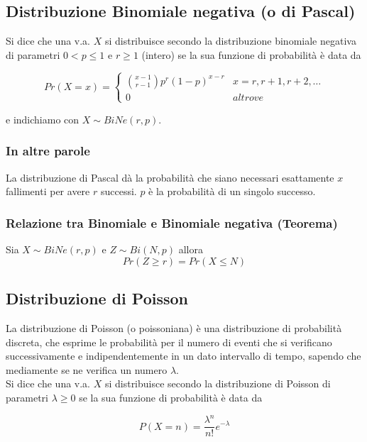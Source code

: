 \documentclass[a4paper]{report}
\begin{document}
  \subsection{Distribuzione Binomiale negativa (o di Pascal)}
  Si dice che una v.a. $X$ si distribuisce secondo la distribuzione binomiale negativa di parametri $0 < p \leqslant 1$ e $r \geq 1$ (intero) se la sua funzione di probabilità è data da

  \[
    Pr(X=x)=
      \begin{cases}
          \binom{x-1}{r-1} p^r (1-p)^{x-r} & x=r, r+1, r+2,\dots \\
          0 & altrove
      \end{cases}
  \]

  e indichiamo con $X \sim BiNe(r,p)$.

  \subsubsection{In altre parole}
  La distribuzione di Pascal dà la probabilità che siano necessari esattamente $x$ fallimenti per avere $r$ successi. $p$ è la probabilità di un singolo successo.

  \subsubsection{Relazione tra Binomiale e Binomiale negativa (Teorema)}
  Sia $X \sim BiNe(r,p)$ e $Z \sim Bi(N,p)$ allora
  \[ Pr(Z \geq r) = Pr(X \leqslant N) \]

  \subsection{Distribuzione di Poisson}
  La distribuzione di Poisson (o poissoniana) è una distribuzione di probabilità discreta, che esprime le probabilità per il numero di eventi che si verificano successivamente e indipendentemente in un dato intervallo di tempo, sapendo che mediamente se ne verifica un numero $\lambda$.\\
  Si dice che una v.a. $X$ si distribuisce secondo la distribuzione di Poisson di parametri $\lambda \geq 0$ se la sua funzione di probabilità è data da

  \[ P(X = n) = \frac{\lambda^n}{n!}e^{-\lambda} \]
\end{document}
